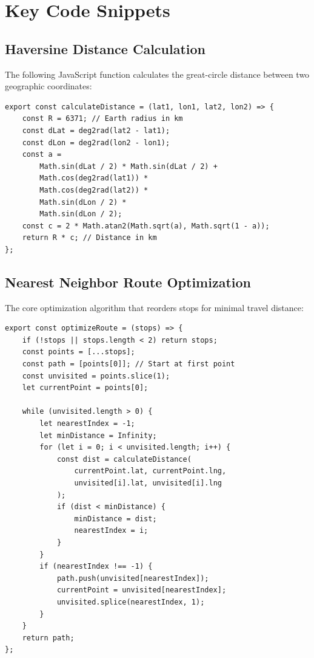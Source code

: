\section{Key Code Snippets}

\subsection{Haversine Distance Calculation}
The following JavaScript function calculates the great-circle distance between two geographic coordinates:
\begin{lstlisting}[style=csharpstyle]
export const calculateDistance = (lat1, lon1, lat2, lon2) => {
    const R = 6371; // Earth radius in km
    const dLat = deg2rad(lat2 - lat1);
    const dLon = deg2rad(lon2 - lon1);
    const a =
        Math.sin(dLat / 2) * Math.sin(dLat / 2) +
        Math.cos(deg2rad(lat1)) *
        Math.cos(deg2rad(lat2)) *
        Math.sin(dLon / 2) *
        Math.sin(dLon / 2);
    const c = 2 * Math.atan2(Math.sqrt(a), Math.sqrt(1 - a));
    return R * c; // Distance in km
};
\end{lstlisting}

\subsection{Nearest Neighbor Route Optimization}
The core optimization algorithm that reorders stops for minimal travel distance:
\begin{lstlisting}[style=csharpstyle]
export const optimizeRoute = (stops) => {
    if (!stops || stops.length < 2) return stops;
    const points = [...stops];
    const path = [points[0]]; // Start at first point
    const unvisited = points.slice(1);
    let currentPoint = points[0];
    
    while (unvisited.length > 0) {
        let nearestIndex = -1;
        let minDistance = Infinity;
        for (let i = 0; i < unvisited.length; i++) {
            const dist = calculateDistance(
                currentPoint.lat, currentPoint.lng,
                unvisited[i].lat, unvisited[i].lng
            );
            if (dist < minDistance) {
                minDistance = dist;
                nearestIndex = i;
            }
        }
        if (nearestIndex !== -1) {
            path.push(unvisited[nearestIndex]);
            currentPoint = unvisited[nearestIndex];
            unvisited.splice(nearestIndex, 1);
        }
    }
    return path;
};
\end{lstlisting}

